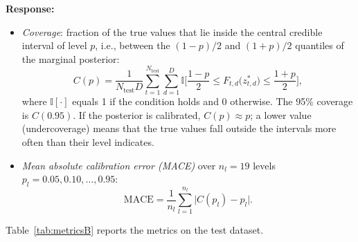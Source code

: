 \documentclass[11pt]{article}
\newenvironment{response}{\par\smallskip\noindent\color{resp}\textbf{Response:}\ }{\par}
\begin{document}
\begin{response}
\begin{itemize}[leftmargin=*]
\begin{equation}
		\label{eq:all}
	\end{equation}
	\item \emph{Coverage}: fraction of the true values that lie inside the central credible interval of level $p$, i.e.,
	between the $(1-p)/2$ and $(1+p)/2$ quantiles of the marginal posterior:
	\begin{equation}
		C(p)=\frac{1}{N_{\text{test}}D}\sum_{t=1}^{N_{\text{test}}}\sum_{d=1}^{D}\mathbb{I}\Big[\frac{1-p}{2}\le F_{t,d}\big(z^*_{t,d}\big)\le\frac{1+p}{2}\Big],
		\label{eq:coverage}
	\end{equation}
	where $\mathbb{I}[\cdot]$ equals 1 if the condition holds and 0 otherwise. The 95\% coverage is $C(0.95)$. If the
	posterior is calibrated, $C(p)\approx p$; a lower value (undercoverage) means that the true values fall outside the
	intervals more often than their level indicates.
	\item \emph{Mean absolute calibration error (MACE)} over $n_l=19$ levels $p_l=0.05,0.10,\dots,0.95$:
	\begin{equation}
		\mathrm{MACE}=\frac{1}{n_l}\sum_{l=1}^{n_l}\big|C(p_l)-p_l\big|.
		\label{eq:mace}
	\end{equation}
\end{itemize}

Table~\ref{tab:metricsB} reports the metrics on the test dataset. 
	

\end{response}
\end{document}
